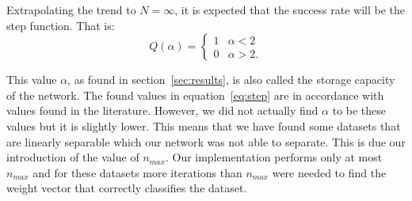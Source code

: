 Extrapolating the trend to \(N=\infty\), it is expected that the success rate will be the step function.
That is:
\begin{equation} \label{eq:step}
	Q(\alpha) =
	\begin{cases}
	    1 & \alpha < 2\\
	    0 & \alpha > 2\text{.}
	\end{cases}
\end{equation}

 This value $\alpha$, as found in section~\ref{sec:results}, is also called the storage capacity of the network. The found values in equation~\ref{eq:step} are in accordance with values found in the literature\cite{perceptron_slides2}. However, we did not actually find $\alpha$ to be these values but it is slightly lower. This means that we have found some datasets that are linearly separable which our network was not able to separate. This is due our introduction of the value of $n_{max}$. Our implementation performs only at most $n_{max}$ and for these datasets more iterations than $n_{max}$ were needed to find the weight vector that correctly classifies the dataset.